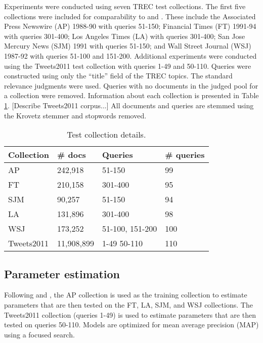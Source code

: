 \documentclass{sig-alternate}
\begin{document}
Experiments were conducted using seven TREC test collections. The first five collections were included for comparability to \cite{Liu2004} and \cite{Wei2006}. 
These include the Associated Press Newswire (AP) 1988-90 with queries 51-150; Financial Times (FT) 1991-94 with queries 301-400; 
Los Angeles Times (LA) with queries 301-400; San Jose Mercury News (SJM) 1991 with queries 51-150; 
and Wall Street Journal (WSJ) 1987-92 with queries 51-100 and 151-200. 
Additional experiments were conducted using the Tweets2011 test collection with queries 1-49 and 50-110.  
Queries were constructed using only the ``title'' field of the TREC topics. The standard relevance judgments were used. 
Queries with no documents in the judged pool for a collection were removed.  Information about each collection is presented in Table \ref{table.details}. 
 [Describe Tweets2011 corpus...] All documents and queries are stemmed using the Krovetz \cite{} stemmer and stopwords removed.

\begin{table}[htdp]
\small
\caption{Test collection details.  }
\begin{center}
\tabcolsep=0.11cm
\begin{tabular}{| l | l | l | l | }
\hline
\bf{Collection} & \bf{\# docs}  & \bf{Queries} & \bf{\# queries} \\ \hline
AP & 242,918 & 51-150 & 99 \\ \hline
FT & 210,158 & 301-400 & 95 \\ \hline
SJM & 90,257 & 51-150 & 94 \\ \hline
LA & 131,896 & 301-400 & 98 \\ \hline
WSJ & 173,252 & 51-100, 151-200 & 100 \\ \hline
Tweets2011 & 11,908,899 & 1-49  50-110  & 110\\ \hline
\end{tabular}
\end{center}
\label{table.details}
\normalsize
\end{table}

\subsection{Parameter estimation}

Following \cite{Liu2004} and \cite{Wei2006}, the AP collection is used as the training collection to estimate parameters that are then tested on the FT, LA, SJM, and WSJ collections. 
The Tweets2011 collection (queries 1-49) is used to estimate parameters that are then tested on queries 50-110. Models are optimized for mean average precision (MAP) using a focused search.
\end{document}
